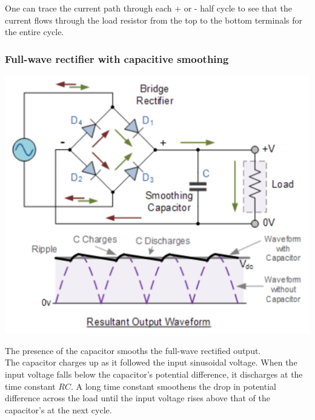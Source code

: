 \documentclass[11pt]{article}
\begin{document}
One can trace the current path through each + or - half cycle to see that the current flows through the load resistor from the top to the bottom terminals for the entire cycle.

\subsubsection{Full-wave rectifier with capacitive smoothing}
\label{sec:org1cd9fdf}
\begin{center}
\includegraphics[width=.9\linewidth]{./images/full-wave-rectifier-with-capacitor.png}
\end{center}

The presence of the capacitor smooths the full-wave rectified output.
\\[0pt]

The capacitor charges up as it followed the input sinusoidal voltage. When the input voltage falls below the capacitor's potential difference, it discharges at the time constant \(RC\). A long time constant smoothens the drop in potential difference across the load until the input voltage rises above that of the capacitor's at the next cycle.

\newpage
\end{document}
